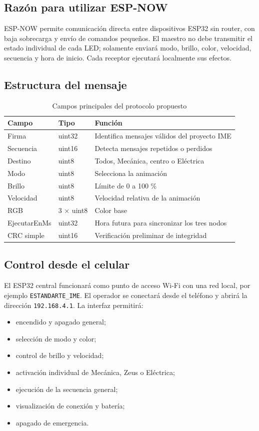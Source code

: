 \documentclass[11pt,a4paper]{article}
\begin{document}
\subsection{Razón para utilizar ESP-NOW}
ESP-NOW permite comunicación directa entre dispositivos ESP32 sin router, con baja sobrecarga y envío de comandos pequeños. El maestro no debe transmitir el estado individual de cada LED; solamente enviará modo, brillo, color, velocidad, secuencia y hora de inicio. Cada receptor ejecutará localmente sus efectos. \cite{espnow}

\subsection{Estructura del mensaje}
\begin{table}[H]
\centering
\caption{Campos principales del protocolo propuesto}
\begin{tabularx}{\textwidth}{@{}P{3.2cm}P{2.2cm}Y@{}}
\toprule
\textbf{Campo} & \textbf{Tipo} & \textbf{Función}\\
\midrule
Firma & uint32 & Identifica mensajes válidos del proyecto IME\\
Secuencia & uint16 & Detecta mensajes repetidos o perdidos\\
Destino & uint8 & Todos, Mecánica, centro o Eléctrica\\
Modo & uint8 & Selecciona la animación\\
Brillo & uint8 & Límite de 0 a 100 \%\\
Velocidad & uint8 & Velocidad relativa de la animación\\
RGB & 3 × uint8 & Color base\\
EjecutarEnMs & uint32 & Hora futura para sincronizar los tres nodos\\
CRC simple & uint16 & Verificación preliminar de integridad\\
\bottomrule
\end{tabularx}
\end{table}

\subsection{Control desde el celular}
El ESP32 central funcionará como punto de acceso Wi-Fi con una red local, por ejemplo \texttt{ESTANDARTE\_IME}. El operador se conectará desde el teléfono y abrirá la dirección \texttt{192.168.4.1}. La interfaz permitirá:
\begin{itemize}
  \item encendido y apagado general;
  \item selección de modo y color;
  \item control de brillo y velocidad;
  \item activación individual de Mecánica, Zeus o Eléctrica;
  \item ejecución de la secuencia general;
  \item visualización de conexión y batería;
  \item apagado de emergencia.
\end{itemize}
\end{document}
